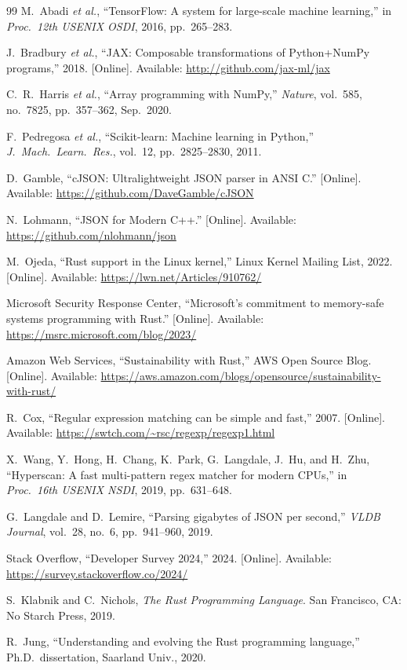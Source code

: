 \documentclass[10pt,conference]{IEEEtran}
\begin{document}
\begin{thebibliography}{99}
M.~Abadi \emph{et al.}, ``TensorFlow: A system for large-scale
machine learning,'' in \emph{Proc.\ 12th USENIX OSDI}, 2016,
pp.~265--283.

J.~Bradbury \emph{et al.}, ``JAX: Composable transformations of
Python+NumPy programs,'' 2018. [Online]. Available:
\url{http://github.com/jax-ml/jax}

C.~R.\ Harris \emph{et al.}, ``Array programming with NumPy,''
\emph{Nature}, vol.~585, no.~7825, pp.~357--362, Sep.\ 2020.

F.~Pedregosa \emph{et al.}, ``Scikit-learn: Machine learning in
Python,'' \emph{J.\ Mach.\ Learn.\ Res.}, vol.~12, pp.~2825--2830,
2011.

D.~Gamble, ``cJSON: Ultralightweight JSON parser in ANSI C.''
[Online]. Available: \url{https://github.com/DaveGamble/cJSON}

N.~Lohmann, ``JSON for Modern C++.'' [Online]. Available:
\url{https://github.com/nlohmann/json}

M.~Ojeda, ``Rust support in the Linux kernel,'' Linux Kernel
Mailing List, 2022. [Online]. Available:
\url{https://lwn.net/Articles/910762/}

Microsoft Security Response Center, ``Microsoft's commitment to
memory-safe systems programming with Rust.'' [Online]. Available:
\url{https://msrc.microsoft.com/blog/2023/}

Amazon Web Services, ``Sustainability with Rust,'' AWS Open
Source Blog. [Online]. Available:
\url{https://aws.amazon.com/blogs/opensource/sustainability-with-rust/}

R.~Cox, ``Regular expression matching can be simple and fast,''
2007. [Online]. Available: \url{https://swtch.com/~rsc/regexp/regexp1.html}

X.~Wang, Y.~Hong, H.~Chang, K.~Park, G.~Langdale, J.~Hu, and
H.~Zhu, ``Hyperscan: A fast multi-pattern regex matcher for modern
CPUs,'' in \emph{Proc.\ 16th USENIX NSDI}, 2019, pp.~631--648.

G.~Langdale and D.~Lemire, ``Parsing gigabytes of JSON per
second,'' \emph{VLDB Journal}, vol.~28, no.~6, pp.~941--960,
2019.

Stack Overflow, ``Developer Survey 2024,'' 2024. [Online].
Available: \url{https://survey.stackoverflow.co/2024/}

S.~Klabnik and C.~Nichols, \emph{The Rust Programming Language}.
San Francisco, CA: No Starch Press, 2019.

R.~Jung, ``Understanding and evolving the Rust programming
language,'' Ph.D.\ dissertation, Saarland Univ., 2020.


\end{thebibliography}
\end{document}
